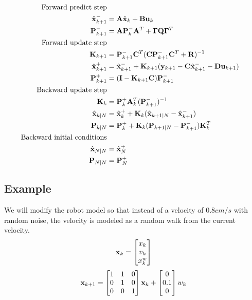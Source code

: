 \begin{theorem}
  \label{thm:kalman_smoother}

  \begin{align}
    \text{Forward predict step} \nonumber \\
    \hat{\mathbf{x}}_{k+1}^- &= \mathbf{A}\hat{\mathbf{x}}_k + \mathbf{B} \mathbf{u}_k \\
    \mathbf{P}_{k+1}^- &= \mathbf{A} \mathbf{P}_k^- \mathbf{A}^T +
      \mathbf{\Gamma}\mathbf{Q}\mathbf{\Gamma}^T \\
    \text{Forward update step} \nonumber \\
    \mathbf{K}_{k+1} &=
      \mathbf{P}_{k+1}^- \mathbf{C}^T (\mathbf{C}\mathbf{P}_{k+1}^- \mathbf{C}^T +
      \mathbf{R})^{-1} \\
    \hat{\mathbf{x}}_{k+1}^+ &=
      \hat{\mathbf{x}}_{k+1}^- + \mathbf{K}_{k+1}(\mathbf{y}_{k+1} -
      \mathbf{C} \hat{\mathbf{x}}_{k+1}^- - \mathbf{D}\mathbf{u}_{k+1}) \\
    \mathbf{P}_{k+1}^+ &= (\mathbf{I} - \mathbf{K}_{k+1}\mathbf{C})\mathbf{P}_{k+1}^- \\
    \text{Backward update step} \nonumber \\
    \mathbf{K}_k &= \mathbf{P}_k^+ \mathbf{A}_k^T (\mathbf{P}_{k+1}^-)^{-1} \\
    \hat{\mathbf{x}}_{k|N} &= \hat{\mathbf{x}}_k^+ +
      \mathbf{K}_k(\hat{\mathbf{x}}_{k+1|N} - \hat{\mathbf{x}}_{k+1}^-) \\
    \mathbf{P}_{k|N} &=
      \mathbf{P}_k^+ + \mathbf{K}_k(\mathbf{P}_{k+1|N} - \mathbf{P}_{k+1}^-)\mathbf{K}_k^T \\
    \text{Backward initial conditions} \nonumber \\
    \hat{\mathbf{x}}_{N|N} &= \hat{\mathbf{x}}_N^+ \\
    \mathbf{P}_{N|N} &= \mathbf{P}_N^+
  \end{align}
\end{theorem}

\subsection{Example}

We will modify the robot model so that instead of a velocity of $0.8 cm/s$ with
random noise, the velocity is modeled as a random walk from the current
velocity.
\begin{equation}
  \mathbf{x}_k =
  \begin{bmatrix}
    x_k \\
    v_k \\
    x_k^w
  \end{bmatrix}
\end{equation}
\begin{equation}
  \mathbf{x}_{k+1} =
  \begin{bmatrix}
    1 & 1 & 0 \\
    0 & 1 & 0 \\
    0 & 0 & 1
  \end{bmatrix} \mathbf{x}_k +
  \begin{bmatrix}
    0 \\
    0.1 \\
    0
  \end{bmatrix} w_k
\end{equation}

